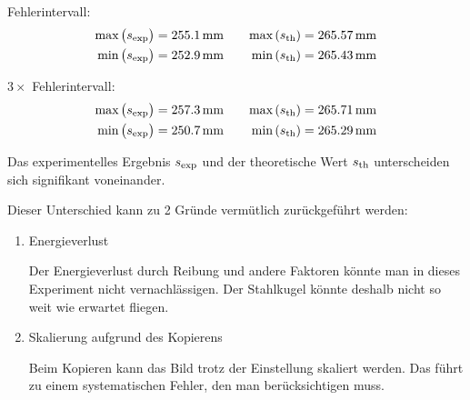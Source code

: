 \documentclass[twoside]{article}
\newcommand{\maxi}[1]{\text{max}\left(#1\right)}
\newcommand{\mini}[1]{\text{min}\left(#1\right)}
\begin{document}
        Fehlerintervall:
        \begin{align*}
            \maxi{\sexp} &= \SI{255.1}{\milli\meter} &&& \maxi{\sth} &= \SI{265.57}{\milli\meter}\\
            \mini{\sexp} &= \SI{252.9}{\milli\meter} &&& \mini{\sth} &= \SI{265.43}{\milli\meter}
        \end{align*}

        $3 \times$ Fehlerintervall:
        \begin{align*}
            \maxi{\sexp} &= \SI{257.3}{\milli\meter} &&& \maxi{\sth} &= \SI{265.71}{\milli\meter}\\
            \mini{\sexp} &= \SI{250.7}{\milli\meter} &&& \mini{\sth} &= \SI{265.29}{\milli\meter}
        \end{align*}

        Das experimentelles Ergebnis $s_{\text{exp}}$ und der theoretische Wert $s_{\text{th}}$ unterscheiden sich signifikant voneinander.

        Dieser Unterschied kann zu 2 Gründe vermütlich zurückgeführt werden:
        \begin{enumerate}
            \item Energieverlust

                Der Energieverlust durch Reibung und andere Faktoren könnte man in dieses Experiment nicht vernachlässigen. Der Stahlkugel könnte deshalb nicht so weit wie erwartet fliegen.

            \item Skalierung aufgrund des Kopierens

                Beim Kopieren kann das Bild trotz der Einstellung skaliert werden. Das führt zu einem systematischen Fehler, den man berücksichtigen muss.
        \end{enumerate}

    \newpage
\end{document}
